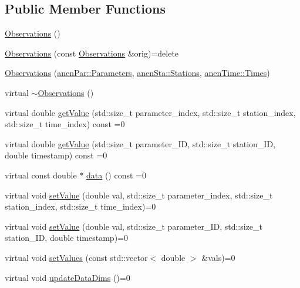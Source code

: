 \subsection*{Public Member Functions}
\begin{DoxyCompactItemize}
\item 
\mbox{\hyperlink{class_observations_a80e66bee67e5e5eb41aa60b6d6f71544}{Observations}} ()
\item 
\mbox{\hyperlink{class_observations_a579feccdac9c26226cf813ac8cf3521a}{Observations}} (const \mbox{\hyperlink{class_observations}{Observations}} \&orig)=delete
\item 
\mbox{\hyperlink{class_observations_acd73489a964b9794e0a265ce394d6f17}{Observations}} (\mbox{\hyperlink{classanen_par_1_1_parameters}{anen\+Par\+::\+Parameters}}, \mbox{\hyperlink{classanen_sta_1_1_stations}{anen\+Sta\+::\+Stations}}, \mbox{\hyperlink{classanen_time_1_1_times}{anen\+Time\+::\+Times}})
\item 
virtual \mbox{\hyperlink{class_observations_a8724b267cce796b0f77f8f2b9e4aaf1d}{$\sim$\+Observations}} ()
\item 
virtual double \mbox{\hyperlink{class_observations_ad7b52b880869698f4d191f47bae766e2}{get\+Value}} (std\+::size\+\_\+t parameter\+\_\+index, std\+::size\+\_\+t station\+\_\+index, std\+::size\+\_\+t time\+\_\+index) const =0
\item 
virtual double \mbox{\hyperlink{class_observations_ac5564bbf13e79d269407d1ecf567cd7f}{get\+Value}} (std\+::size\+\_\+t parameter\+\_\+\+ID, std\+::size\+\_\+t station\+\_\+\+ID, double timestamp) const =0
\item 
virtual const double $\ast$ \mbox{\hyperlink{class_observations_abd666d72594c8e61234296626756ec01}{data}} () const =0
\item 
virtual void \mbox{\hyperlink{class_observations_a6f00b4a2277ce9e77cd0d5975f4066f8}{set\+Value}} (double val, std\+::size\+\_\+t parameter\+\_\+index, std\+::size\+\_\+t station\+\_\+index, std\+::size\+\_\+t time\+\_\+index)=0
\item 
virtual void \mbox{\hyperlink{class_observations_a6ec8166ad0f141e23a07847ab3646a61}{set\+Value}} (double val, std\+::size\+\_\+t parameter\+\_\+\+ID, std\+::size\+\_\+t station\+\_\+\+ID, double timestamp)=0
\item 
virtual void \mbox{\hyperlink{class_observations_a3aaf49cad714ff61c105d26b4b083ac3}{set\+Values}} (const std\+::vector$<$ double $>$ \&vals)=0
\item 
virtual void \mbox{\hyperlink{class_observations_aab0540879c2d3fdf5f91d30ea2f902fd}{update\+Data\+Dims}} ()=0

\end{DoxyCompactItemize}
